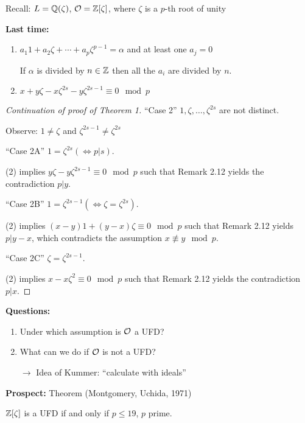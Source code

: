 

Recall: $L=\mathbb{Q}(\zeta)$, $\mathcal{O} = \mathbb{Z}[\zeta]$, where $\zeta$ is a $p$-th root of unity

\bigskip
\textbf{Last time:}
\begin{enumerate}[(1)]
	\item $a_1 1 +a_2 \zeta + \cdots + a_p\zeta^{p-1} =\alpha$ and at least one $a_j=0$
	
	If $\alpha$ is divided by $n \in \mathbb{Z}$ then all the $a_i$ are divided by $n$.
	

\item $x+y\zeta-x\zeta^{2s} -y\zeta^{2s-1} \equiv 0 \mod p$
\end{enumerate}

\begin{proof}[Continuation of proof of Theorem 1]
	\enquote{Case 2} $1, \zeta, \dots, \zeta^ {2s}$ are not distinct.
	
	Observe: $1 \neq \zeta$ and $\zeta^ {2s-1} \neq \zeta^ {2s}$
	
	\bigskip \enquote{Case 2A} $1 = \zeta^ {2s} (\Leftrightarrow p|s)$.
	
	(2) implies $y\zeta -y\zeta ^{2s-1} \equiv 0 \mod p$ such that Remark 2.12 yields the contradiction $p|y$.
	
	\bigskip \enquote{Case 2B}  $1 = \zeta^ {2s-1} (\Leftrightarrow \zeta = \zeta^ {2s})$.
	
	(2) implies $(x-y)1 + (y-x) \zeta \equiv 0 \mod p$ such that Remark 2.12 yields $p | y-x$, which contradicts the assumption $x \not \equiv y \mod p$.
	
	\bigskip \enquote{Case 2C} $\zeta = \zeta^ {2s-1}$.
	
	(2) implies $x-x\zeta^2 \equiv 0 \mod p$ such that Remark 2.12 yields the contradiction $p|x$.
\end{proof}

\textbf{Questions:}
\begin{enumerate}[(1)]
\item Under which assumption is $\mathcal{O}$ a UFD?
\item What can we do if $\mathcal{O}$ is not a UFD?

$\rightarrow$ Idea of Kummer: \enquote{calculate with ideals}
\end{enumerate}

\bigskip\textbf{Prospect:} Theorem (Montgomery, Uchida, 1971)

$\mathbb{Z}[\zeta]$ is a UFD if and only if $p\leq 19$, $p$ prime.

